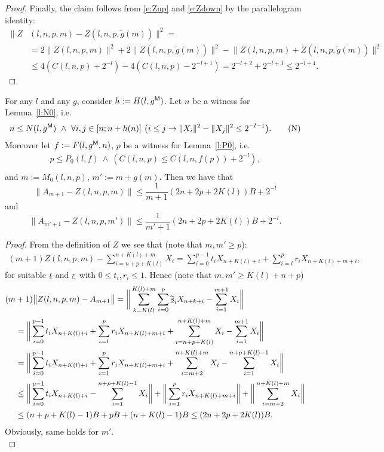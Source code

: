 \begin{proof}
Finally, the claim follows from \eqref{e:Zup}
and \eqref{e:Zdown} by the parallelogram identity:
\begin{align*}
\big\|Z&(l,n,p,m) - Z( l,n,p,\tilde g(m) ) \big\|^2 =\\ 
&=2\big\|Z( l,n,p,m)\big\|^2 + 2\big\|Z( l,n,p,\tilde g(m) )\big\|^2  - \big\|Z(l,n,p,m) + Z( l,n,p,\tilde g(m) )\big\|^2 \\
&\leq 4( C(l,n,p) + 2^{-l} ) - 4( C(l,n,p) - 2^{-l+1} ) = 2^{-l+2} + 2^{-l+3} \leq 2^{-l+4}.
\end{align*}
\end{proof}

\begin{lemma}\label{l:ZA}
For any $l$ and any $g$, consider $h:= H(l,g\protect{^{\textsf{\upshape M}}})$. Let
$n$ be a witness for Lemma~\ref{l:N0}, i.e. 
\[
n\leq N(l,g\powM)\ \wedge\ \forall i,j\in[n;n+h(n)]\ 
\big( i\leq j\rightarrow \|X_i\|^2-\|X_j\|^2\leq 2^{-l-1} \big) . \tag{N}  \label{e:N3}
\]
Moreover let $f:=F(l,g\protect{^{\textsf{\upshape M}}},n)$,
$p$ be a witness for Lemma~\ref{l:P0}, i.e. 
\begin{align*}
p\leq P_0(l,f)\ \wedge\ ( C(l,n,p)\leq C(l,n,f(p)) + 2^{-l}  ),  \tag{P}\\
\end{align*} 
and  $m:=M_0(l,n,p)$, $m':=m+g(m)$.
Then we have that
\[
 \|A_{m+1} - Z( l,n,p,m )\|\leq \frac{1}{m+1}(2n + 2p + 2K(l))B +2^{-l}
\]
and
\[
 \|A_{m'+1} - Z( l,n,p,m' )\|\leq \frac{1}{m'+1}(2n + 2p + 2K(l))B +2^{-l}.
\]
\end{lemma}
\begin{proof}
From the definition of $Z$ we see that (note that $m,m'\geq p$):
\begin{align*}
(m+1)Z(l,n,p,m) - \sum^{n+K(l)+m}_{i=n+p+K(l)} X_{i} = 
\sum^{p-1}_{i=0} t_iX_{n+K(l)+i} + \sum^{p}_{i=l} r_iX_{n+K(l)+m+i},
\end{align*}
for suitable $\underline t$ and $\underline r$ with $0\leq t_i,r_i\leq 1$. Hence (note that $m,m'\geq K(l)+n+p$)
\begin{align*}
(m&+1)\big\|Z( l,n,p,m ) - A_{m+1}\big\| =
	 \bigg\| \sum^{K(l)+m}_{k=K(l)}\sum^{p}_{i=0}  \widetilde{\underline s}_i X_{n+k+i} - \sum^{m+1}_{i=1}X_i \bigg\|	\\
	 &=\bigg\| \sum^{p-1}_{i=0} t_iX_{n+K(l)+i} + \sum^{p}_{i=1} r_iX_{n+K(l)+m+i} + \sum^{n+K(l)+m}_{i=n+p+K(l)} X_{i} 
	      - \sum^{m+1}_{i=1}X_i \bigg\| \\
	 &= \bigg\| \sum^{p-1}_{i=0} t_iX_{n+K(l)+i} + \sum^{p}_{i=1} r_iX_{n+K(l)+m+i} + \sum^{n+K(l)+m}_{i=m+2} X_{i} - \sum^{n+p+K(l)-1}_{i=1} X_{i}  \bigg\| \\
	 &\leq \bigg\| \sum^{p-1}_{i=0} t_iX_{n+K(l)+i} - \sum^{n+p+K(l)-1}_{i=1} X_{i} \bigg\| + \bigg\|\sum^{p}_{i=1} r_iX_{n+K(l)+m+i} \bigg\| +  \bigg\| \sum^{n+K(l)+m}_{i=m+2} X_{i} \bigg\|  \\
	 &\leq (n+p+K(l)-1)B + pB + (n+K(l)-1)B \leq (2n + 2p + 2K(l))B.
\end{align*}
Obviously, same holds for $m'$.\\
\end{proof}


